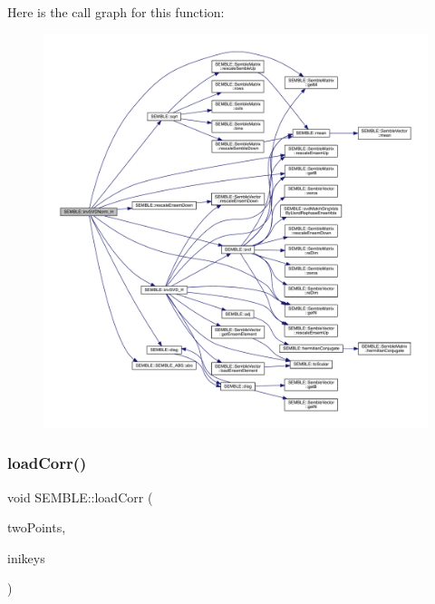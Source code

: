 Here is the call graph for this function\+:
\nopagebreak
\begin{figure}[H]
\begin{center}
\leavevmode
\includegraphics[width=350pt]{d7/dfd/namespaceSEMBLE_a952949666873f95d18fdb968c4453f3b_cgraph}
\end{center}
\end{figure}
\mbox{\label{namespaceSEMBLE_ac1cc350e27e1e8e132f8b9af4145950f}} 
\subsubsection{\texorpdfstring{loadCorr()}{loadCorr()}}
{\footnotesize\ttfamily void S\+E\+M\+B\+L\+E\+::load\+Corr (\begin{DoxyParamCaption}\item[{\mbox{\hyperlink{classSEMBLE_1_1SembleRCorrs}{Semble\+R\+Corrs}} \&}]{two\+Points,  }\item[{const Fit\+Ini\+Props\+\_\+t \&}]{inikeys }\end{DoxyParamCaption})}

